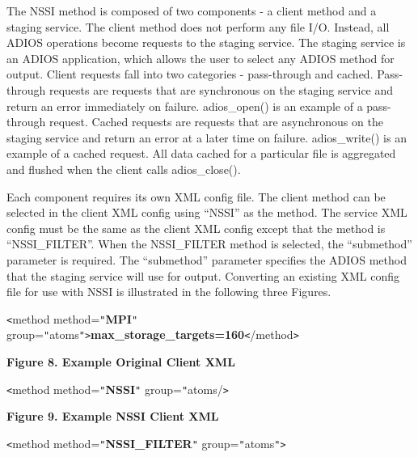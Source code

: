 \vspace{10pt}
The NSSI method is composed of two components - a client method and a staging service. 
 The client method does not perform any file I/O.  Instead, all ADIOS operations 
become requests to the staging service.  The staging service is an ADIOS application, 
which allows the user to select any ADIOS method for output.  Client requests fall 
into two categories - pass-through and cached.  Pass-through requests are requests 
that are synchronous on the staging service and return an error immediately on 
failure.  adios\_open() is an example of a pass-through request.  Cached requests 
are requests that are asynchronous on the staging service and return an error at 
a later time on failure.  adios\_write() is an example of a cached request.  All 
data cached for a particular file is aggregated and flushed when the client calls 
adios\_close().

\vspace{10pt}
Each component requires its own XML config file.  The client method can be selected 
in the client XML config using ``NSSI'' as the method.  The service XML config 
must be the same as the client XML config except that the method is ``NSSI\_FILTER''. 
 When the NSSI\_FILTER method is selected, the ``submethod'' parameter is required. 
 The ``submethod'' parameter specifies the ADIOS method that the staging service 
will use for output.  Converting an existing XML config file for use with NSSI 
is illustrated in the following three Figures.


\vspace{18pt}
\texttt{<}method method=\texttt{"}\textbf{MPI}\texttt{"} group=\texttt{"}atoms\texttt{"}\texttt{>}\textbf{max\_storage\_targets=160}\texttt{<}/method\texttt{>}

\label{HToc144350167}

\vspace{18pt}
\leftskip=18pt
{\color{color20} \textbf{Figure 8. Example Original Client XML}}



\vspace{18pt}
\texttt{<}method method=\texttt{"}\textbf{NSSI}\texttt{"} group=\texttt{"}atoms/\texttt{>}

\label{HToc144350168}

\vspace{18pt}
{\color{color20} \textbf{Figure 9. Example NSSI Client XML}}



\vspace{18pt}
\texttt{<}method method=\texttt{"}\textbf{NSSI\_FILTER}\texttt{"} group=\texttt{"}atoms\texttt{"}\texttt{>}

